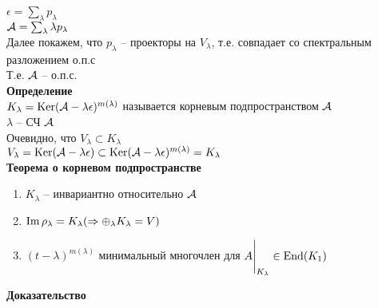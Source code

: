 \documentclass[12pt]{article}
\begin{document}
$\epsilon = \sum_\lambda p_\lambda$\\
$\mathcal{A} = \sum_\lambda \lambda p_\lambda$\\
Далее покажем, что $p_\lambda$ -- проекторы на $V_\lambda$, т.е. совпадает со спектральным разложением о.п.с\\
Т.е. $\mathcal{A}$ -- о.п.с.\\
\textbf{Определение}\\
$K_\lambda = \operatorname{Ker} (\mathcal{A} - \lambda \epsilon)^{m(\lambda)}$ называется корневым подпространством $\mathcal{A}$\\
$\lambda$ -- СЧ $\mathcal{A}$\\
Очевидно, что $V_\lambda \subset K_\lambda$\\
$V_\lambda = \operatorname{Ker} (\mathcal{A} - \lambda \epsilon) \subset \operatorname{Ker} (\mathcal{A} - \lambda \epsilon)^{m(\lambda)} = K_\lambda$\\
\textbf{Теорема о корневом подпространстве}
\begin{enumerate}
    \item $K_\lambda$ -- инвариантно относительно $\mathcal{A}$
    \item $\operatorname{Im} \rho_\lambda = K_\lambda (\Rightarrow \oplus_\lambda K_\lambda = V)$
    \item $(t-\lambda)^{m(\lambda)}$ минимальный многочлен для $A\Biggr|_{K_\lambda} \in \operatorname{End}(K_1)$
\end{enumerate}
\textbf{Доказательство}
\end{document}
